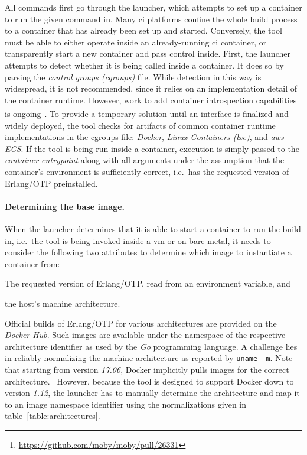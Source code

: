 All commands first go through the launcher, which attempts to set up a container to run the given command in. Many \acrshort{ci} platforms confine the whole build process to a container that has already been set up and started. Conversely, the tool must be able to either operate inside an already-running \acrshort{ci} container, or transparently start a new container and pass control inside. First, the launcher attempts to detect whether it is being called inside a container. It does so by parsing the \emph{control groups (cgroups)} file. While detection in this way is widespread, it is not recommended, since it relies on an implementation detail of the container runtime. However, work to add container introspection capabilities is ongoing\footnote{\url{https://github.com/moby/moby/pull/26331}}. To provide a temporary solution until an interface is finalized and widely deployed, the tool checks for artifacts of common container runtime implementations in the cgroups file: \emph{Docker}, \emph{Linux Containers (lxc)}, and \emph{\acrfull{aws} ECS}. If the tool is being run inside a container, execution is simply passed to the \emph{container entrypoint} along with all arguments under the assumption that the container's environment is sufficiently correct, i.e.~has the requested version of Erlang/OTP preinstalled.

\paragraph{Determining the base image.} When the launcher determines that it is able to start a container to run the build in, i.e.~the tool is being invoked inside a \acrshort{vm} or on bare metal, it needs to consider the following two attributes to determine which image to instantiate a container from:
\begin{enumerate*}[label=(\roman*)]
  \item The requested version of Erlang/OTP, read from an environment variable, and
  \item the host's machine architecture.
\end{enumerate*}

Official builds of Erlang/OTP for various architectures are provided on the \emph{Docker Hub}. Such images are available under the namespace of the respective architecture identifier as used by the \emph{Go} programming language. A challenge lies in reliably normalizing the machine architecture as reported by \lstinline|uname -m|. Note that starting from version \emph{17.06}, Docker implicitly pulls images for the correct architecture.~\cite{docker:docs} However, because the tool is designed to support Docker down to version \emph{1.12}, the launcher has to manually determine the architecture and map it to an image namespace identifier using the normalizations given in table~\ref{table:architectures}.

